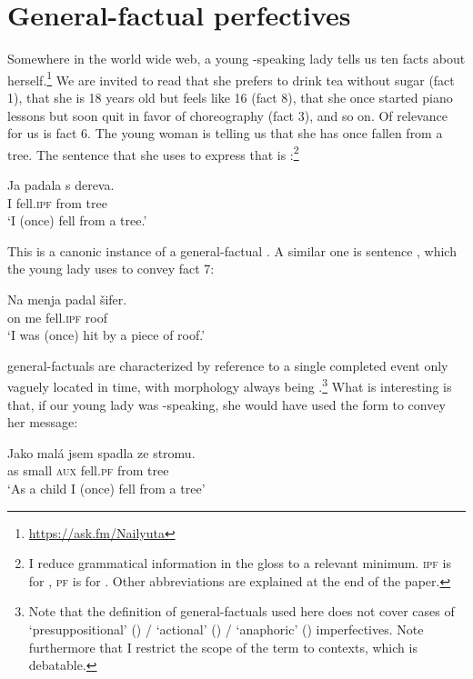 \documentclass[output=paper,modfonts,newtxmath,hidelinks]{langscibook}
\begin{document}
\section{General-factual perfectives}\label{13:s2} 
Somewhere in the world wide web, a young -speaking lady tells us ten facts about herself.\footnote{\url{https://ask.fm/Nailyuta}} 
We are invited to read that she prefers to drink tea without sugar (fact 1), that she is 18 years old but feels like 16 (fact 8), that she once started 
piano lessons but soon quit in favor of choreography (fact 3), and so on. Of relevance for us is fact 6. The young woman is telling us that she has once fallen from a tree. 
The  sentence that she uses to express that is :\footnote{I reduce grammatical information in the gloss to a relevant minimum. \textsc{ipf} is for , \textsc{pf} is for . Other abbreviations are explained at the end of the paper.}


\ea \label{13:dereva}
\gll Ja padala s dereva.\\
I fell.\textsc{ipf} from tree\\
\glt `I (once) fell from a tree.'
\z


\noindent This is a canonic instance of a  general-factual . A similar one is sentence , which the young lady uses to convey fact 7:

\ea \label{13:shifer}
\gll Na menja padal šifer. \\
on me fell.\textsc{ipf} roof \\
\glt `I was (once) hit by a piece of roof.' 
\z

\noindent {} general-factuals are characterized by reference to a single completed event only vaguely located in  time, with 
 morphology always being .\footnote{Note that the definition of general-factuals used here does not cover cases of `presuppositional' (\citealt{Gronn2004}) / `actional' (\citealt{Padu1996}) / `anaphoric' (\citealt{Mehlig2011}) imperfectives. Note furthermore that I restrict the scope of the term to  contexts, which is debatable.} What is interesting is that, if our young lady was -speaking, she would have used the  form to convey her message:
 
\ea \label{13:stromu}
\gll Jako mal\'a jsem spadla ze stromu. \\
as small \textsc{aux} fell.\textsc{pf} from tree\\
\glt `As a child I (once) fell from a tree' 
\z
\end{document}
